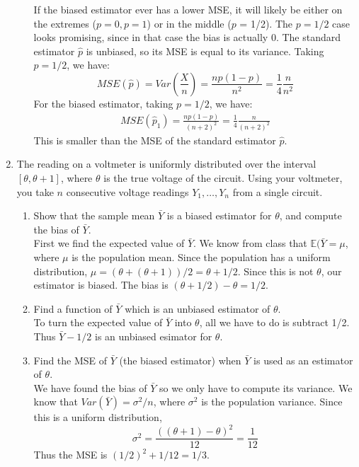 \documentclass[12pt]{article}
\def\E{{\mathbb E}}
\begin{document}
\begin{enumerate}
\begin{enumerate}
If the biased estimator ever has a lower MSE, it will likely be either on the extremes ($p = 0, p = 1$) or in the middle ($p$ = 1/2). The $p = 1/2$ case looks promising, since in that case the bias is actually 0. The standard estimator $\hat{p}$ is unbiased, so its MSE is equal to its variance. Taking $p = 1/2$, we have:
\[
MSE(\hat{p}) = Var\left(\frac{X}{n}\right) = \frac{np(1-p)}{n^2} = \frac{1}{4}\frac{n}{n^2}
\] 
For the biased estimator, taking $p = 1/2$, we have:
\begin{align*}
MSE(\hat{p}_1) = \frac{np(1-p)}{(n+2)^2} = \frac{1}{4}\frac{n}{(n+2)^2}
\end{align*}
This is smaller than the MSE of the standard estimator $\hat{p}$.
\end{enumerate}

\item The reading on a voltmeter is uniformly distributed over the interval $[\theta, \theta+1]$, where $\theta$ is the true voltage of the circuit. Using your voltmeter, you take $n$ consecutive voltage readings $Y_1, \dots, Y_n$ from a single circuit.
\begin{enumerate}
\item Show that the sample mean $\bar{Y}$ is a biased estimator for $\theta$, and compute the bias of $\bar{Y}$.\\

First we find the expected value of $\bar{Y}$. We know from class that $\E(\bar{Y} = \mu$, where $\mu$ is the population mean. Since the population has a uniform distribution, $\mu = (\theta + (\theta + 1)) / 2 = \theta + 1/2$. Since this is not $\theta$, our estimator is biased. The bias is $(\theta + 1/2) - \theta = 1/2$.

\item Find a function of $\bar{Y}$ which is an unbiased estimator of $\theta$.\\

To turn the expected value of $\bar{Y}$ into $\theta$, all we have to do is subtract 1/2. Thus $\bar{Y} - 1/2$ is an unbiased esimator for $\theta$.

\item Find the MSE of $\bar{Y}$ (the biased estimator) when $\bar{Y}$ is used as an estimator of $\theta$.\\

We have found the bias of $\bar{Y}$ so we only have to compute its variance. We know that $Var(\bar{Y}) = \sigma^2 / n$, where $\sigma^2$ is the population variance. Since this is a uniform distribution,
\[
\sigma^2 = \frac{((\theta + 1) - \theta)^2}{12} = \frac{1}{12}
\]
Thus the MSE is $(1/2)^2 + 1/12 = 1/3$.
\end{enumerate}


\end{enumerate}
\end{document}
